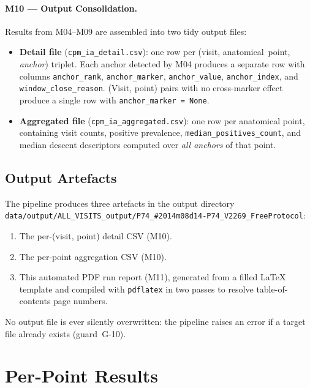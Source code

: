 \documentclass[a4paper,11pt]{article}
\begin{document}
\paragraph{M10 --- Output Consolidation.}
Results from M04--M09 are assembled into two tidy output files:
\begin{itemize}
  \item \textbf{Detail file} (\texttt{cpm\_ia\_detail.csv}): one row per
        (visit, anatomical~point, \emph{anchor}) triplet. Each anchor detected by M04
        produces a separate row with columns \texttt{anchor\_rank},
        \texttt{anchor\_marker}, \texttt{anchor\_value}, \texttt{anchor\_index},
        and \texttt{window\_close\_reason}.
        (Visit, point) pairs with no cross-marker effect produce a single row with
        \texttt{anchor\_marker = None}.
  \item \textbf{Aggregated file} (\texttt{cpm\_ia\_aggregated.csv}): one row per
        anatomical point, containing visit counts, positive prevalence,
        \texttt{median\_positives\_count}, and median descent descriptors computed over
        \emph{all anchors} of that point.
\end{itemize}

\subsection{Output Artefacts}

The pipeline produces three artefacts in the output directory \texttt{data/output/ALL\_VISITS\_output/P74\_\#2014m08d14-P74\_V2269\_FreeProtocol}:
\begin{enumerate}
  \item The per-(visit, point) detail CSV (M10).
  \item The per-point aggregation CSV (M10).
  \item This automated PDF run report (M11), generated from a filled \LaTeX{} template
        and compiled with \texttt{pdflatex} in two passes to resolve table-of-contents
        page numbers.
\end{enumerate}
No output file is ever silently overwritten: the pipeline raises an error if a target
file already exists (guard~G-10).

\section{Per-Point Results}
\end{document}
